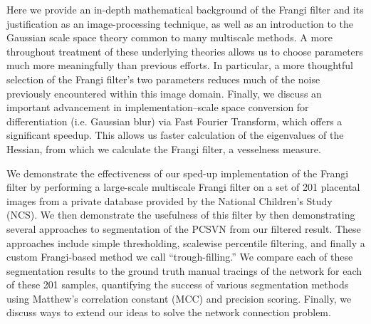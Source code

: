 Here we provide an in-depth mathematical background of the Frangi filter and
its justification as an image-processing technique, as well as an introduction
to the Gaussian scale space theory common to many multiscale methods. A more throughout
treatment of these underlying theories allows us to choose parameters much more meaningfully than previous efforts. In particular, a more thoughtful selection of the Frangi filter's two parameters reduces much of the noise previously encountered within this image domain.  Finally,
we discuss an important advancement in implementation--scale space conversion
for differentiation (i.e. Gaussian blur) via Fast Fourier Transform, which
offers a significant speedup. This allows us faster calculation of the
eigenvalues of the Hessian, from which we calculate the Frangi filter, a
vesselness measure.

We demonstrate the effectiveness of our sped-up implementation of the Frangi
filter by performing a large-scale multiscale Frangi filter on a set of 201
placental images from a private database provided by the National Children's
Study (NCS). We then demonstrate the usefulness of this filter by
then demonstrating several approaches to segmentation
of the PCSVN from our filtered result. These approaches include simple thresholding,
scalewise percentile filtering, and finally a custom Frangi-based method we call ``trough-filling.''
We compare each of these segmentation results to
the ground truth manual tracings of the network for each of these 201 samples, quantifying the success of various segmentation methods using Matthew's correlation constant (MCC) and precision scoring. Finally, we discuss ways to extend our ideas to solve the network connection problem.